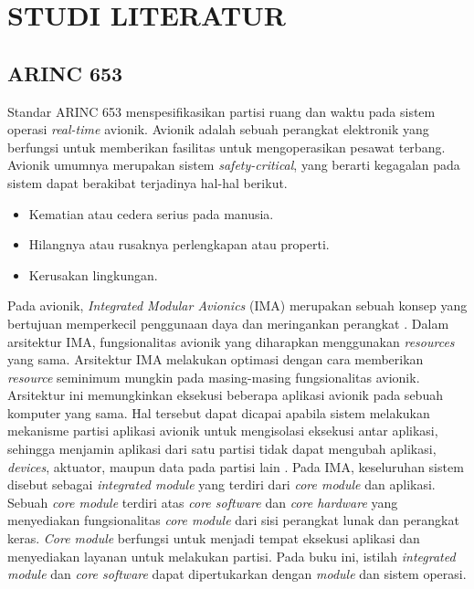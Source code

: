 \chapter{STUDI LITERATUR}

\section{ARINC 653}

Standar ARINC 653 menspesifikasikan partisi ruang dan waktu pada sistem operasi
\textit{real-time} avionik.  Avionik adalah sebuah perangkat elektronik yang berfungsi untuk
memberikan fasilitas untuk mengoperasikan pesawat terbang.  Avionik umumnya merupakan sistem
\textit{safety\hyp critical}, yang berarti kegagalan pada sistem dapat berakibat terjadinya
hal-hal berikut.

\begin{itemize}

    \item Kematian atau cedera serius pada manusia.

    \item Hilangnya atau rusaknya perlengkapan atau properti.

    \item Kerusakan lingkungan.

\end{itemize}

Pada avionik, \textit{Integrated Modular Avionics} (IMA) merupakan sebuah konsep yang bertujuan
memperkecil penggunaan daya dan meringankan perangkat \citep[p.~2.A.2-1]{Garside2009}.  Dalam
arsitektur IMA, fungsionalitas avionik yang diharapkan menggunakan \textit{resources} yang sama.
Arsitektur IMA melakukan optimasi dengan cara memberikan \textit{resource} seminimum mungkin
pada masing-masing fungsionalitas avionik.  Arsitektur ini memungkinkan eksekusi beberapa
aplikasi avionik pada sebuah komputer yang sama.  Hal tersebut dapat dicapai apabila sistem
melakukan mekanisme partisi aplikasi avionik untuk mengisolasi eksekusi antar aplikasi, sehingga
menjamin aplikasi dari satu partisi tidak dapat mengubah aplikasi, \textit{devices}, aktuator,
maupun data pada partisi lain \citep[pp.~11-12]{Rushby2000}.  Pada IMA, keseluruhan sistem
disebut sebagai \textit{integrated module} yang terdiri dari \textit{core module} dan aplikasi.
Sebuah \textit{core module} terdiri atas \textit{core software} dan \textit{core hardware} yang
menyediakan fungsionalitas \textit{core module} dari sisi perangkat lunak dan perangkat keras.
\textit{Core module} berfungsi untuk menjadi tempat eksekusi aplikasi dan menyediakan layanan
untuk melakukan partisi.  Pada buku ini, istilah \textit{integrated module} dan \textit{core
software} dapat dipertukarkan dengan \textit{module} dan sistem operasi.


